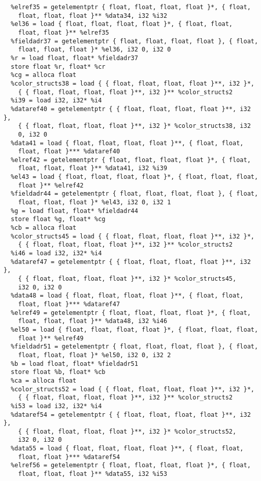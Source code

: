 \documentclass[main.tex]{subfiles}
\begin{document}
{\begin{lstlisting}
  %elref35 = getelementptr { float, float, float, float }*, { float,
    float, float, float }** %data34, i32 %i32
  %el36 = load { float, float, float, float }*, { float, float, 
    float, float }** %elref35
  %fieldadr37 = getelementptr { float, float, float, float }, { float, 
    float, float, float }* %el36, i32 0, i32 0
  %r = load float, float* %fieldadr37
  store float %r, float* %cr
  %cg = alloca float
  %color_structs38 = load { { float, float, float, float }**, i32 }*, 
    { { float, float, float, float }**, i32 }** %color_structs2
  %i39 = load i32, i32* %i4
  %dataref40 = getelementptr { { float, float, float, float }**, i32 }, 
    { { float, float, float, float }**, i32 }* %color_structs38, i32
    0, i32 0
  %data41 = load { float, float, float, float }**, { float, float, 
    float, float }*** %dataref40
  %elref42 = getelementptr { float, float, float, float }*, { float, 
    float, float, float }** %data41, i32 %i39
  %el43 = load { float, float, float, float }*, { float, float, float, 
    float }** %elref42
  %fieldadr44 = getelementptr { float, float, float, float }, { float, 
    float, float, float }* %el43, i32 0, i32 1
  %g = load float, float* %fieldadr44
  store float %g, float* %cg
  %cb = alloca float
  %color_structs45 = load { { float, float, float, float }**, i32 }*, 
    { { float, float, float, float }**, i32 }** %color_structs2
  %i46 = load i32, i32* %i4
  %dataref47 = getelementptr { { float, float, float, float }**, i32 },
    { { float, float, float, float }**, i32 }* %color_structs45, 
    i32 0, i32 0
  %data48 = load { float, float, float, float }**, { float, float, 
    float, float }*** %dataref47
  %elref49 = getelementptr { float, float, float, float }*, { float, 
    float, float, float }** %data48, i32 %i46
  %el50 = load { float, float, float, float }*, { float, float, float,
    float }** %elref49
  %fieldadr51 = getelementptr { float, float, float, float }, { float, 
    float, float, float }* %el50, i32 0, i32 2
  %b = load float, float* %fieldadr51
  store float %b, float* %cb
  %ca = alloca float
  %color_structs52 = load { { float, float, float, float }**, i32 }*, 
    { { float, float, float, float }**, i32 }** %color_structs2
  %i53 = load i32, i32* %i4
  %dataref54 = getelementptr { { float, float, float, float }**, i32 }, 
    { { float, float, float, float }**, i32 }* %color_structs52,
    i32 0, i32 0
  %data55 = load { float, float, float, float }**, { float, float, 
    float, float }*** %dataref54
  %elref56 = getelementptr { float, float, float, float }*, { float,
    float, float, float }** %data55, i32 %i53

\end{lstlisting}}
\end{document}
